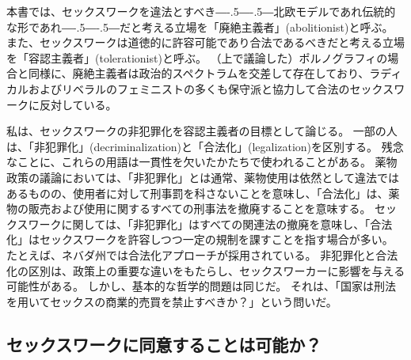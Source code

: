 \documentclass[paper=a4,book,openany]{jlreq}
\def\DDASH{―\kern-.5\zw―\kern-.5\zw―} %
\begin{document}
本書では、セックスワークを違法とすべき{\DDASH}北欧モデルであれ伝統的な形であれ{\DDASH}だと考える立場を「廃絶主義者」(abolitionist)と呼ぶ。
また、セックスワークは道徳的に許容可能であり合法であるべきだと考える立場を「容認主義者」(tolerationist)と呼ぶ。
（上で議論した）ポルノグラフィの場合と同様に、廃絶主義者は政治的スペクトラムを交差して存在しており、ラディカルおよびリベラルのフェミニストの多くも保守派と協力して合法のセックスワークに反対している。

私は、セックスワークの非犯罪化を容認主義者の目標として論じる。
一部の人は、「非犯罪化」(decriminalization)と「合法化」(legalization)を区別する。
残念なことに、これらの用語は一貫性を欠いたかたちで使われることがある。
薬物政策の議論においては、「非犯罪化」とは通常、薬物使用は依然として違法ではあるものの、使用者に対して刑事罰を科さないことを意味し、「合法化」は、薬物の販売および使用に関するすべての刑事法を撤廃することを意味する。
セックスワークに関しては、「非犯罪化」はすべての関連法の撤廃を意味し、「合法化」はセックスワークを許容しつつ一定の規制を課すことを指す場合が多い。
たとえば、ネバダ州では合法化アプローチが採用されている。
非犯罪化と合法化の区別は、政策上の重要な違いをもたらし、セックスワーカーに影響を与える可能性がある。
しかし、基本的な哲学的問題は同じだ。
それは、「国家は刑法を用いてセックスの商業的売買を禁止すべきか？」という問いだ\citep{tani15:_sex_worker_explain_differ_legal_decrim_prost}。

\subsection{セックスワークに同意することは可能か？}
\end{document}
